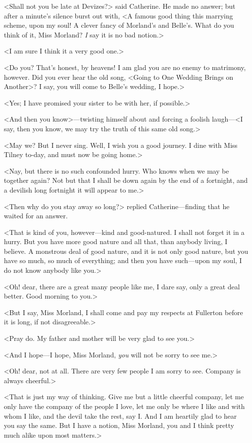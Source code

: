  <Shall not you be late at Devizes?> said Catherine. He made no answer; but after a minute's silence burst out with, <A famous good thing this marrying scheme, upon my soul! A clever fancy of Morland's and Belle's. What do you think of it, Miss Morland? \textit{I} say it is no bad notion.> 

 <I am sure I think it a very good one.> 

 <Do you? That's honest, by heavens! I am glad you are no enemy to matrimony, however. Did you ever hear the old song, <Going to One Wedding Brings on Another>? I say, you will come to Belle's wedding, I hope.> 

 <Yes; I have promised your sister to be with her, if possible.> 

 <And then you know>—twisting himself about and forcing a foolish laugh—<I say, then you know, we may try the truth of this same old song.> 

 <May we? But I never sing. Well, I wish you a good journey. I dine with Miss Tilney to-day, and must now be going home.> 

 <Nay, but there is no such confounded hurry. Who knows when we may be together again? Not but that I shall be down again by the end of a fortnight, and a devilish long fortnight it will appear to me.> 

 <Then why do you stay away so long?> replied Catherine—finding that he waited for an answer. 

 <That is kind of you, however—kind and good-natured. I shall not forget it in a hurry. But you have more good nature and all that, than anybody living, I believe. A monstrous deal of good nature, and it is not only good nature, but you have so much, so much of everything; and then you have such—upon my soul, I do not know anybody like you.> 

 <Oh! dear, there are a great many people like me, I dare say, only a great deal better. Good morning to you.> 

 <But I say, Miss Morland, I shall come and pay my respects at Fullerton before it is long, if not disagreeable.> 

 <Pray do. My father and mother will be very glad to see you.> 

 <And I hope—I hope, Miss Morland, \textit{you} will not be sorry to see me.> 

 <Oh! dear, not at all. There are very few people I am sorry to see. Company is always cheerful.> 

 <That is just my way of thinking. Give me but a little cheerful company, let me only have the company of the people I love, let me only be where I like and with whom I like, and the devil take the rest, say I. And I am heartily glad to hear you say the same. But I have a notion, Miss Morland, you and I think pretty much alike upon most matters.> 

